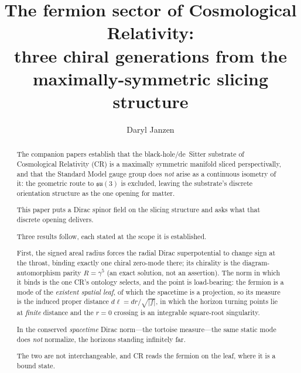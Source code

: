 \documentclass[11pt]{article}
\title{The fermion sector of Cosmological Relativity:\\
three chiral generations from the maximally-symmetric slicing structure}
\author{Daryl Janzen}
\date{}
\newcommand{\su}{\mathfrak{su}}
\begin{document}
\maketitle

\begin{abstract}
The companion papers establish that the black-hole/de~Sitter substrate of Cosmological Relativity (CR) is a maximally symmetric manifold sliced perspectivally, and that the Standard Model gauge group does \emph{not} arise as a continuous isometry of it: the geometric route to $\su(3)$ is excluded, leaving the substrate's discrete orientation structure as the one opening for matter. 

This paper puts a Dirac spinor field on the slicing structure and asks what that discrete opening delivers. 

Three results follow, each stated at the scope it is established. 

First, the signed areal radius forces the radial Dirac superpotential to change sign at the throat, binding exactly one chiral zero-mode there; its chirality is the diagram-automorphism parity $R=\gamma^5$ (an exact solution, not an assertion). The norm in which it binds is the one CR's ontology selects, and the point is load-bearing: the fermion is a mode of the \emph{existent spatial leaf}, of which the spacetime is a projection, so its measure is the induced proper distance $d\ell=dr/\sqrt{|f|}$, in which the horizon turning points lie at \emph{finite} distance and the $r=0$ crossing is an integrable square-root singularity. 

In the conserved \emph{spacetime} Dirac norm---the tortoise measure---the same static mode does \emph{not} normalize, the horizons standing infinitely far. 

The two are not interchangeable, and CR reads the fermion on the leaf, where it is a bound state. 


\end{abstract}
\end{document}
